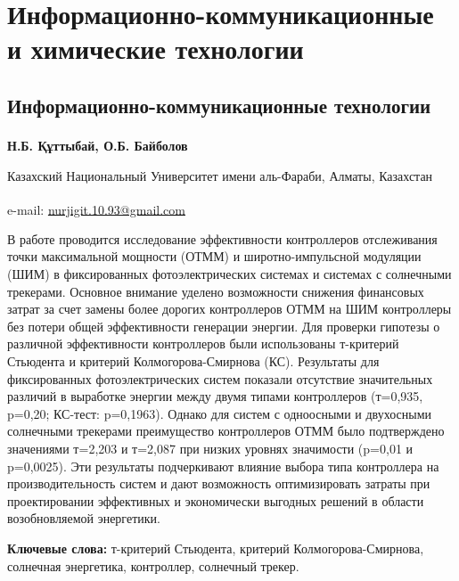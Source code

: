 \newpage
\let\cleardoublepage\clearpage
\part{Информационно-коммуникационные и химические технологии}
\chapter{Информационно-коммуникационные технологии}

\begin{articleheader}

{\bfseries
Н.Б. Құттыбай\textsuperscript{\envelope },
О.Б. Байболов
}
\end{articleheader}

\begin{affiliation}
Казахский Национальный Университет имени аль-Фараби, Алматы, Казахстан

\raggedright \textsuperscript{\envelope }e-mail: \href{mailto:nurjigit.10.93@gmail.com}{nurjigit.10.93@gmail.com}
\end{affiliation}

В работе проводится исследование эффективности контроллеров отслеживания
точки максимальной мощности (ОТММ) и широтно-импульсной модуляции (ШИМ)
в фиксированных фотоэлектрических системах и системах с солнечными
трекерами. Основное внимание уделено возможности снижения финансовых
затрат за счет замены более дорогих контроллеров ОТММ на ШИМ контроллеры
без потери общей эффективности генерации энергии. Для проверки гипотезы
о различной эффективности контроллеров были использованы т-критерий
Стьюдента и критерий Колмогорова-Смирнова (КС). Результаты для
фиксированных фотоэлектрических систем показали отсутствие значительных
различий в выработке энергии между двумя типами контроллеров (т=0,935,
p=0,20; КС-тест: p=0,1963). Однако для систем с одноосными и двухосными
солнечными трекерами преимущество контроллеров ОТММ было подтверждено
значениями т=2,203 и т=2,087 при низких уровнях значимости (p=0,01 и
p=0,0025). Эти результаты подчеркивают влияние выбора типа контроллера
на производительность систем и дают возможность оптимизировать затраты
при проектировании эффективных и экономически выгодных решений в области
возобновляемой энергетики.

{\bfseries Ключевые слова:} т-критерий Стьюдента, критерий
Колмогорова-Смирнова, солнечная энергетика, контроллер, солнечный
трекер.

